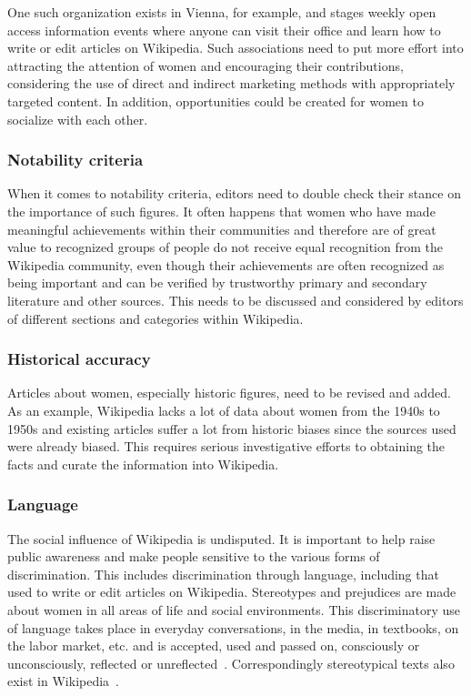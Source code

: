\documentclass[a4paper, 11pt]{article}
\begin{document}
One such organization exists in Vienna, for example, and stages weekly open access information events where anyone can visit their office and learn how to write or edit articles on Wikipedia. Such associations need to put more effort into attracting the attention of women and encouraging their contributions, considering the use of direct and indirect marketing methods with appropriately targeted content. In addition, opportunities could be created for women to socialize with each other.

\subsubsection{Notability criteria} \label{sec:gender-gap-wikipedia:fixnotability}
When it comes to notability criteria, editors need to double check their stance on the importance of such figures. It often happens that women who have made meaningful achievements within their communities and therefore are of great value to recognized groups of people do not receive equal recognition from the Wikipedia community, even though their achievements are often recognized as being important and can be verified by trustworthy primary and secondary literature and other sources. This needs to be discussed and considered by editors of different sections and categories within Wikipedia.

\subsubsection{Historical accuracy} \label{sec:gender-gap-wikipedia:historyaccuracy}
Articles about women, especially historic figures, need to be revised and added. As an example, Wikipedia lacks a lot of data about women from the 1940s to 1950s and existing articles suffer a lot from historic biases since the sources used were already biased. This requires serious investigative efforts to obtaining the facts and curate the information into Wikipedia.

\subsubsection{Language} \label{sec:gender-gap-wikipedia:language}
The social influence of Wikipedia is undisputed. It is important to help raise public awareness and make people sensitive to the various forms of discrimination. This includes discrimination through language, including that used to write or edit articles on Wikipedia. Stereotypes and prejudices are made about women in all areas of life and social environments. This discriminatory use of language takes place in everyday conversations, in the media, in textbooks, on the labor market, etc. and is accepted, used and passed on, consciously or unconsciously, reflected or unreflected~\cite{peters2017bbc}. Correspondingly stereotypical texts also exist in Wikipedia~\cite{graells2015first}.
\end{document}
